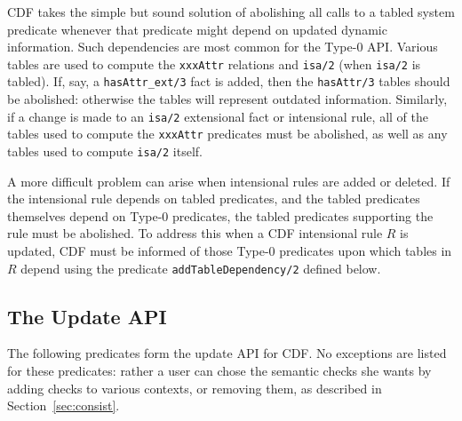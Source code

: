 CDF takes the simple but sound solution of abolishing all calls to a
tabled system predicate whenever that predicate might depend on
updated dynamic information.  Such dependencies are most common for
the Type-0 API.  Various tables are used to compute the {\tt xxxAttr}
relations and {\tt isa/2} (when {\tt isa/2} is tabled).  If, say, a
{\tt hasAttr\_ext/3} fact is added, then the {\tt hasAttr/3} tables
should be abolished: otherwise the tables will represent outdated
information.  Similarly, if a change is made to an {\tt isa/2}
extensional fact or intensional rule, all of the tables used to
compute the {\tt xxxAttr} predicates must be abolished, as well as any
tables used to compute {\tt isa/2} itself.

A more difficult problem can arise when intensional rules are added or
deleted.  If the intensional rule depends on tabled predicates, and
the tabled predicates themselves depend on Type-0 predicates, the
tabled predicates supporting the rule must be abolished.  To address
this when a CDF intensional rule $R$ is updated, CDF must be informed
of those Type-0 predicates upon which tables in $R$ depend using the
predicate {\tt addTableDependency/2} defined below.


\subsection{The Update API}

The following predicates form the update API for CDF.  No exceptions
are listed for these predicates: rather a user can chose the semantic
checks she wants by adding checks to various contexts, or removing
them, as described in Section~\ref{sec:consist}.

